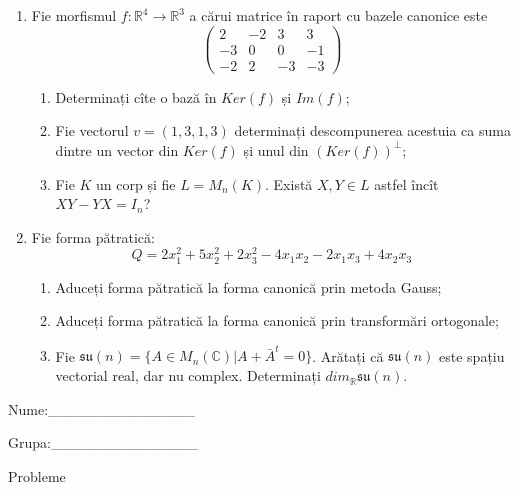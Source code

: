 \documentclass{article}
\begin{document}
\begin{enumerate}
 \item Fie morfismul $f:\mathbb{R}^4 \to \mathbb{R}^3$ a cărui matrice în raport cu bazele canonice este
$$\begin{pmatrix}
2&-2&3&3\\
-3&0&0&-1\\
-2&2&-3&-3
\end{pmatrix}$$

\begin{enumerate}
\item Determinați cîte o bază în $Ker(f)$ și $Im(f)$;
\item Fie vectorul $v=(1,3,1,3)$ determinați descompunerea acestuia ca suma dintre un vector din $Ker(f)$ și unul din $(Ker(f))^\perp$;
\item Fie $K$ un corp și fie $L=M_n(K)$. Există $X,Y \in L$ astfel încît $XY-YX=I_n$?  
\end{enumerate}
\item Fie forma pătratică:
$$Q= 2x_1^2+5x_2^2+2x_3^2-4x_1x_2-2x_1x_3+4x_2x_3$$

\begin{enumerate}
\item Aduceți forma pătratică la forma canonică prin metoda Gauss;
\item Aduceți forma pătratică la forma canonică prin transformări ortogonale;
\item Fie $\mathfrak{su}(n)=\{ A \in M_n(\mathbb{C}) | A+\bar{A}^t=0\}$. Arătați că $\mathfrak{su}(n)$ este spațiu vectorial real, dar nu complex.
Determinați $dim_{\mathbb{R}}\mathfrak{su}(n)$.
\end{enumerate}
\end{enumerate}
\newpage
\begin{flushright}
Nume:\_\_\_\_\_\_\_\_\_\_\_\_\_\_
 
 
Grupa:\_\_\_\_\_\_\_\_\_\_\_\_\_\_
\end{flushright}
\begin{center}
\vspace{2cm}
{\Large Probleme}
\vspace{2cm}
\end{center}
\end{document}
